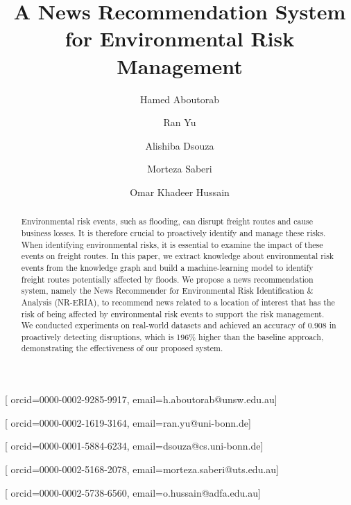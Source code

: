 \documentclass[
]{ceurart}
\begin{document}


\title{A News Recommendation System for
Environmental Risk Management}

\tnotemark[1]

\author[1]{Hamed Aboutorab}[%
orcid=0000-0002-9285-9917,
email=h.aboutorab@unsw.edu.au]
\cormark[1]
\address[1]{University of New South Wales, Canberra, Australia }

\author[2]{Ran Yu}[%
orcid=0000-0002-1619-3164,
email=ran.yu@uni-bonn.de]


\author[2]{Alishiba Dsouza}[%
orcid=0000-0001-5884-6234,
email=dsouza@cs.uni-bonn.de]
\address[2]{Data Science \& Intelligent Systems Group (DSIS), University of Bonn, Bonn, Germany}


\author[3]{Morteza Saberi}[%
orcid=0000-0002-5168-2078,
email=morteza.saberi@uts.edu.au]
\address[3]{University of Technology Sydney, Sydney, Australia}

\author[1]{Omar Khadeer Hussain}[%
orcid=0000-0002-5738-6560,
email=o.hussain@adfa.edu.au]



\begin{abstract}
Environmental risk events, such as flooding, can disrupt freight routes and cause business losses. It is therefore crucial to proactively identify and manage these risks. When identifying environmental risks, it is essential to examine the impact of these events on freight routes. In this paper, we extract knowledge about environmental risk events from the knowledge graph and build a machine-learning model to identify freight routes potentially affected by floods. We propose a news recommendation system, namely the News Recommender for Environmental Risk Identification \& Analysis (NR-ERIA), to recommend news related to a location of interest that has the risk of being affected by environmental risk events to support the risk management.
We conducted experiments on real-world datasets and achieved an accuracy of 0.908 in proactively detecting disruptions, which is 196\% higher than the baseline approach, demonstrating the effectiveness of our proposed system.

\end{abstract}
\end{document}
